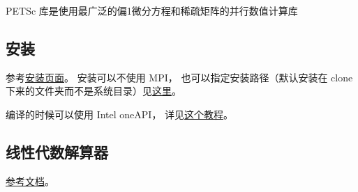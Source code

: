 
\begin{issues}
\issueDraft
\end{issues}

PETSc 库是使用最广泛的偏1微分方程和稀疏矩阵的并行数值计算库

\subsection{安装}
参考\href{https://petsc.org/release/install/install_tutorial/}{安装页面}。
安装可以不使用 MPI， 也可以指定安装路径（默认安装在 clone 下来的文件夹而不是系统目录）见\href{https://petsc.org/release/install/install/#mpi-problems-i-don-t-want-mpi}{这里}。

编译的时候可以使用 Intel oneAPI， 详见\href{https://www.intel.com/content/www/us/en/developer/articles/technical/mkl-blas-lapack-with-petsc.html}{这个教程}。

\subsection{线性代数解算器}
\href{https://petsc.org/release/docs/manual/ksp/}{参考文档}。
